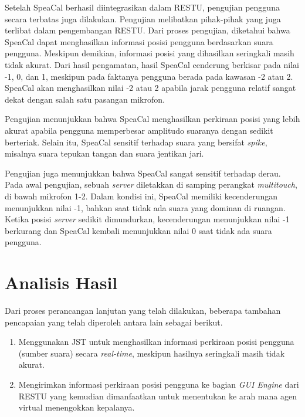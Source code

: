 Setelah SpeaCal berhasil diintegrasikan dalam RESTU, pengujian pengguna secara terbatas juga dilakukan. Pengujian melibatkan pihak-pihak yang juga terlibat dalam pengembangan RESTU. Dari proses pengujian, diketahui bahwa SpeaCal dapat menghasilkan informasi posisi pengguna berdasarkan suara pengguna. Meskipun demikian, informasi posisi yang dihasilkan seringkali masih tidak akurat. Dari hasil pengamatan, hasil SpeaCal cenderung berkisar pada nilai -1, 0, dan 1, meskipun pada faktanya pengguna berada pada kawasan -2 atau 2. SpeaCal akan menghasilkan nilai -2 atau 2 apabila jarak pengguna relatif sangat dekat dengan salah satu pasangan mikrofon.

Pengujian menunjukkan bahwa SpeaCal menghasilkan perkiraan posisi yang lebih akurat apabila pengguna memperbesar amplitudo suaranya dengan sedikit berteriak. Selain itu, SpeaCal sensitif terhadap suara yang bersifat \textit{spike}, misalnya suara tepukan tangan dan suara jentikan jari.

Pengujian juga menunjukkan bahwa SpeaCal sangat sensitif terhadap derau. Pada awal pengujian, sebuah \textit{server} diletakkan di samping perangkat \textit{multitouch}, di bawah mikrofon 1-2. Dalam kondisi ini, SpeaCal memiliki kecenderungan menunjukkan nilai -1, bahkan saat tidak ada suara yang dominan di ruangan. Ketika posisi \textit{server} sedikit dimundurkan, kecenderungan menunjukkan nilai -1 berkurang dan SpeaCal kembali menunjukkan nilai 0 saat tidak ada suara pengguna.




\section{Analisis Hasil}

Dari proses perancangan lanjutan yang telah dilakukan, beberapa tambahan pencapaian yang telah diperoleh antara lain sebagai berikut.

\begin{enumerate}
\item Menggunakan JST untuk menghasilkan informasi perkiraan posisi pengguna (sumber suara) secara \textit{real-time}, meskipun hasilnya seringkali masih tidak akurat.
\item Mengirimkan informasi perkiraan posisi pengguna ke bagian \textit{GUI Engine} dari RESTU yang kemudian dimanfaatkan untuk menentukan ke arah mana agen virtual menengokkan kepalanya.
\end{enumerate}

